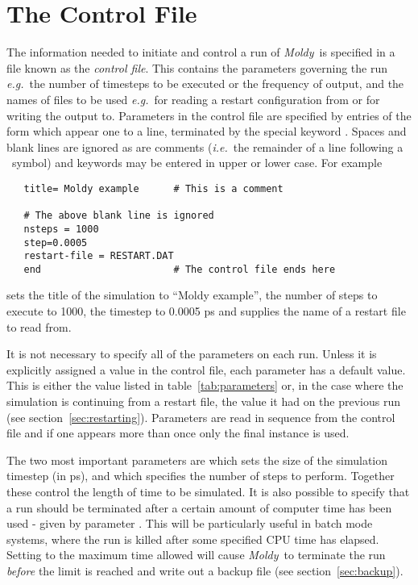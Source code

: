 \documentclass[a4paper,twoside]{report}
\newcommand{\moldy}{\emph{Moldy}}
\newcommand{\eg}{\emph{e.g.}}
\newcommand{\ie}{\emph{i.e.}}
\begin{document}
\section{The Control File}%
\label{sec:control}

The information needed to initiate and control a run of \moldy\ is
specified in a file known as the \emph{control file}. This contains
the parameters governing the run \eg\ the number of timesteps to be
executed or the frequency of output, and the names of files to be used
\eg\ for reading a restart configuration from or for writing the
output to. Parameters in the control file are specified by entries of
the form  which appear one to a line,
terminated by the special keyword .  Spaces and blank
lines are ignored as are comments (\ie\ the remainder of a line
following a \Lit{\#}~symbol) and keywords may be entered in upper
or lower case. For example
\begin{verbatim}
   title= Moldy example      # This is a comment

   # The above blank line is ignored
   nsteps = 1000
   step=0.0005
   restart-file = RESTART.DAT
   end                       # The control file ends here
\end{verbatim}
sets the title of the simulation to ``Moldy example'', the number of
steps to execute to 1000, the timestep to 0.0005 ps and supplies the
name of a restart file to read from.

It is not necessary to specify all of the parameters on each run.
Unless it is explicitly assigned a value in the control file, each
parameter has a default value.  This is either the value listed in
table~\ref{tab:parameters} or, in the case where the simulation is
continuing from a restart file, the value it had on the previous run
(see section~\ref{sec:restarting}). Parameters are read in sequence
from the control file and if one appears more than once only the final
instance is used.

The two most important parameters are  which sets the
size of the simulation timestep (in ps), and  which
specifies the number of steps to perform.  Together these control the
length of time to be simulated.  It is also possible to specify that a
run should be terminated after a certain amount of computer time has
been used - given by parameter .  This will be
particularly useful in batch mode systems, where the run is killed
after some specified CPU time has elapsed.  Setting 
to the maximum time allowed will cause \moldy\ to terminate the run
\emph{before} the limit is reached and write out a backup file (see
section~\ref{sec:backup}).
\end{document}
